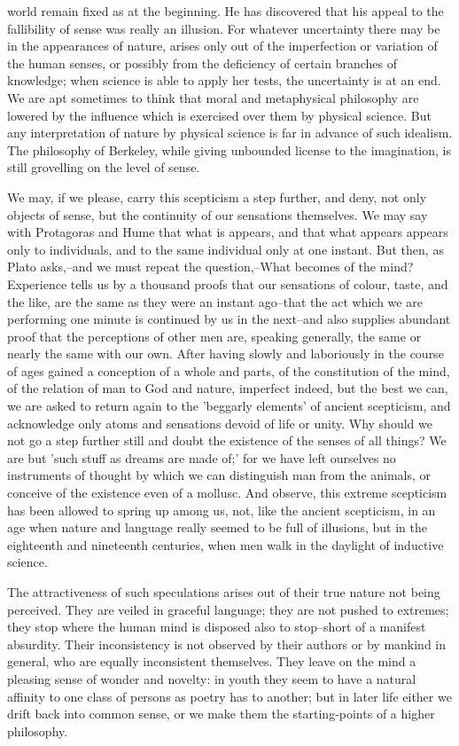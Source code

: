 world remain fixed as at the beginning. He has discovered that his
appeal to the fallibility of sense was really an illusion. For whatever
uncertainty there may be in the appearances of nature, arises only out
of the imperfection or variation of the human senses, or possibly from
the deficiency of certain branches of knowledge; when science is able to
apply her tests, the uncertainty is at an end. We are apt sometimes
to think that moral and metaphysical philosophy are lowered by the
influence which is exercised over them by physical science. But any
interpretation of nature by physical science is far in advance of such
idealism. The philosophy of Berkeley, while giving unbounded license to
the imagination, is still grovelling on the level of sense.

We may, if we please, carry this scepticism a step further, and
deny, not only objects of sense, but the continuity of our sensations
themselves. We may say with Protagoras and Hume that what is appears,
and that what appears appears only to individuals, and to the same
individual only at one instant. But then, as Plato asks,--and we must
repeat the question,--What becomes of the mind? Experience tells us by a
thousand proofs that our sensations of colour, taste, and the like,
are the same as they were an instant ago--that the act which we are
performing one minute is continued by us in the next--and also
supplies abundant proof that the perceptions of other men are, speaking
generally, the same or nearly the same with our own. After having slowly
and laboriously in the course of ages gained a conception of a whole and
parts, of the constitution of the mind, of the relation of man to God
and nature, imperfect indeed, but the best we can, we are asked to
return again to the 'beggarly elements' of ancient scepticism, and
acknowledge only atoms and sensations devoid of life or unity. Why
should we not go a step further still and doubt the existence of the
senses of all things? We are but 'such stuff as dreams are made of;'
for we have left ourselves no instruments of thought by which we can
distinguish man from the animals, or conceive of the existence even of a
mollusc. And observe, this extreme scepticism has been allowed to spring
up among us, not, like the ancient scepticism, in an age when nature and
language really seemed to be full of illusions, but in the eighteenth
and nineteenth centuries, when men walk in the daylight of inductive
science.

The attractiveness of such speculations arises out of their true nature
not being perceived. They are veiled in graceful language; they are not
pushed to extremes; they stop where the human mind is disposed also to
stop--short of a manifest absurdity. Their inconsistency is not observed
by their authors or by mankind in general, who are equally inconsistent
themselves. They leave on the mind a pleasing sense of wonder and
novelty: in youth they seem to have a natural affinity to one class of
persons as poetry has to another; but in later life either we drift
back into common sense, or we make them the starting-points of a higher
philosophy.

